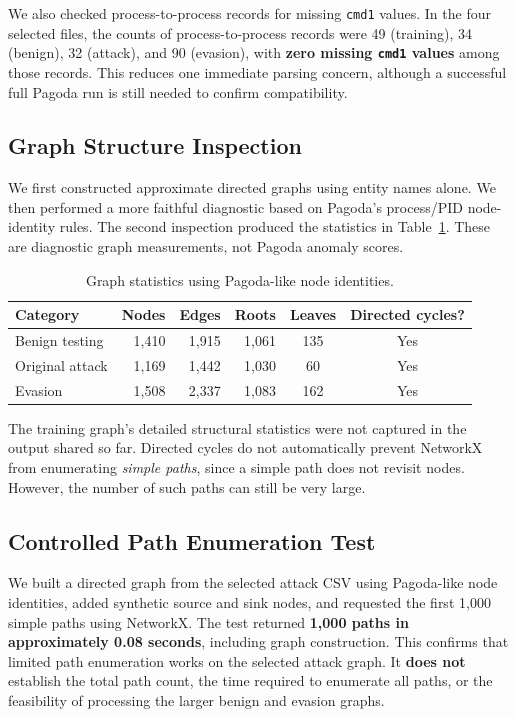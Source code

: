 \documentclass[11pt,letterpaper]{article}
\begin{document}
We also checked process-to-process records for missing \texttt{cmd1} values. In the four selected files, the counts of process-to-process records were 49 (training), 34 (benign), 32 (attack), and 90 (evasion), with \textbf{zero missing \texttt{cmd1} values} among those records. This reduces one immediate parsing concern, although a successful full Pagoda run is still needed to confirm compatibility.

\subsection{Graph Structure Inspection}
We first constructed approximate directed graphs using entity names alone. We then performed a more faithful diagnostic based on Pagoda's process/PID node-identity rules. The second inspection produced the statistics in Table~\ref{tab:graphs}. These are diagnostic graph measurements, not Pagoda anomaly scores.

\begin{table}[htbp]
\centering
\caption{Graph statistics using Pagoda-like node identities.}
\label{tab:graphs}
\begin{tabular}{@{}lrrrcc@{}}
\toprule
Category & Nodes & Edges & Roots & Leaves & Directed cycles? \\
\midrule
Benign testing & 1,410 & 1,915 & 1,061 & 135 & Yes \\
Original attack & 1,169 & 1,442 & 1,030 & 60 & Yes \\
Evasion & 1,508 & 2,337 & 1,083 & 162 & Yes \\
\bottomrule
\end{tabular}
\end{table}

The training graph's detailed structural statistics were not captured in the output shared so far. Directed cycles do not automatically prevent NetworkX from enumerating \emph{simple paths}, since a simple path does not revisit nodes. However, the number of such paths can still be very large.

\subsection{Controlled Path Enumeration Test}
We built a directed graph from the selected attack CSV using Pagoda-like node identities, added synthetic source and sink nodes, and requested the first 1,000 simple paths using NetworkX. The test returned \textbf{1,000 paths in approximately 0.08 seconds}, including graph construction. This confirms that limited path enumeration works on the selected attack graph. It \textbf{does not} establish the total path count, the time required to enumerate all paths, or the feasibility of processing the larger benign and evasion graphs.
\end{document}
